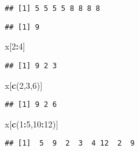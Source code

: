 \documentclass[
]{article}
\newenvironment{Shaded}{\begin{snugshade}}{\end{snugshade}}
\newcommand{\CommentTok}[1]{\textcolor[rgb]{0.56,0.35,0.01}{\textit{#1}}}
\newcommand{\DecValTok}[1]{\textcolor[rgb]{0.00,0.00,0.81}{#1}}
\newcommand{\KeywordTok}[1]{\textcolor[rgb]{0.13,0.29,0.53}{\textbf{#1}}}
\newcommand{\NormalTok}[1]{#1}
\newcommand{\OperatorTok}[1]{\textcolor[rgb]{0.81,0.36,0.00}{\textbf{#1}}}
\newcommand{\StringTok}[1]{\textcolor[rgb]{0.31,0.60,0.02}{#1}}
\begin{document}
\begin{verbatim}
## [1] 5 5 5 5 8 8 8 8
\end{verbatim}

\begin{Shaded}
\end{Shaded}

\begin{verbatim}
## [1] 9
\end{verbatim}

\begin{Shaded}
\begin{Highlighting}[]
\NormalTok{x[}\DecValTok{2}\OperatorTok{:}\DecValTok{4}\NormalTok{]}
\end{Highlighting}
\end{Shaded}

\begin{verbatim}
## [1] 9 2 3
\end{verbatim}

\begin{Shaded}
\begin{Highlighting}[]
\NormalTok{x[}\KeywordTok{c}\NormalTok{(}\DecValTok{2}\NormalTok{,}\DecValTok{3}\NormalTok{,}\DecValTok{6}\NormalTok{)]}
\end{Highlighting}
\end{Shaded}

\begin{verbatim}
## [1] 9 2 6
\end{verbatim}

\begin{Shaded}
\begin{Highlighting}[]
\NormalTok{x[}\KeywordTok{c}\NormalTok{(}\DecValTok{1}\OperatorTok{:}\DecValTok{5}\NormalTok{,}\DecValTok{10}\OperatorTok{:}\DecValTok{12}\NormalTok{)]}
\end{Highlighting}
\end{Shaded}

\begin{verbatim}
## [1]  5  9  2  3  4 12  2  9
\end{verbatim}
\end{document}
